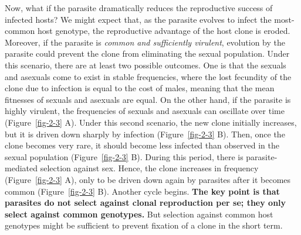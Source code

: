 \documentclass[
  letterpaper,
]{book}
\begin{document}
Now, what if the parasite dramatically reduces the reproductive success
of infected hosts? We might expect that, as the parasite evolves to
infect the most-common host genotype, the reproductive advantage of the
host clone is eroded. Moreover, if the parasite is \emph{common and
sufficiently virulent}, evolution by the parasite could prevent the
clone from eliminating the sexual population. Under this scenario, there
are at least two possible outcomes. One is that the sexuals and asexuals
come to exist in stable frequencies, where the lost fecundity of the
clone due to infection is equal to the cost of males, meaning that the
mean fitnesses of sexuals and asexuals are equal. On the other hand, if
the parasite is highly virulent, the frequencies of sexuals and asexuals
can oscillate over time (Figure~\ref{fig-2-3} A). Under this second
scenario, the new clone initially increases, but it is driven down
sharply by infection (Figure~\ref{fig-2-3} B). Then, once the clone
becomes very rare, it should become less infected than observed in the
sexual population (Figure~\ref{fig-2-3} B). During this period, there is
parasite-mediated selection against sex. Hence, the clone increases in
frequency (Figure~\ref{fig-2-3} A), only to be driven down again by
parasites after it becomes common (Figure~\ref{fig-2-3} B). Another
cycle begins. \textbf{The key point is that parasites do not select
against clonal reproduction per se; they only select against common
genotypes.} But selection against common host genotypes might be
sufficient to prevent fixation of a clone in the short term.
\end{document}
